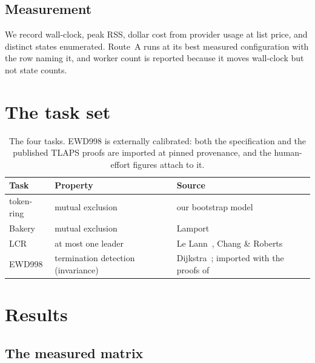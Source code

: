 \documentclass[11pt,a4paper]{article}
\begin{document}
\subsection{Measurement}

We record wall-clock, peak RSS, dollar cost from provider usage at list price, and distinct states
enumerated. Route~A runs at its best measured configuration with the row naming it, and worker count is
reported because it moves wall-clock but not state counts.

\section{The task set}

\begin{table}[htbp]
\centering
\small
\begin{tabular}{@{}lll@{}}
\toprule
Task & Property & Source \\
\midrule
token-ring & mutual exclusion & our bootstrap model \\
Bakery & mutual exclusion & Lamport~\cite{bakery} \\
LCR & at most one leader & Le Lann~\cite{lelann}, Chang \& Roberts~\cite{changroberts} \\
EWD998 & termination detection (invariance) & Dijkstra~\cite{ewd998}; imported with the proofs of~\cite{trifecta} \\
\bottomrule
\end{tabular}
\caption{The four tasks. EWD998 is externally calibrated: both the specification and the published
TLAPS proofs are imported at pinned provenance, and the human-effort figures attach to it.}
\end{table}

\section{Results}

\subsection{The measured matrix}
\end{document}
